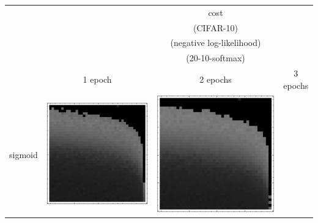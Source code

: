 \documentclass[10pt]{article}
\begin{document}
\begin{tabular}{|c|c|c|c|}
        \hline
        & & {\LARGE cost} & \\
        & & (CIFAR-10) & \\
        & & (negative log-likelihood) & \\
        & & (20-10-softmax) & \\
        \hline
         & 1 epoch & 2 epochs & 3 epochs\\ \hline
sigmoid 
        & \includegraphics[scale=0.25]{plots/simple/LF-20S10S-20T10-CIFAR-1.eps}
        & \includegraphics[scale=0.25]{plots/simple/LF-20S10S-20T10-CIFAR-2.eps}

\end{tabular}
\end{document}
